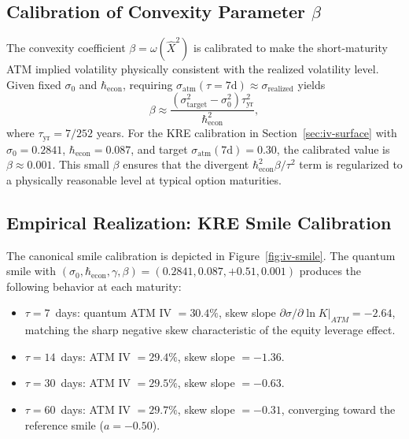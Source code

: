 \subsection{Calibration of Convexity Parameter \texorpdfstring{$\beta$}{beta}}

The convexity coefficient $\beta = \omega(\hat{X}^2)$ is calibrated to make the
short-maturity ATM implied volatility physically consistent with the realized
volatility level. Given fixed $\sigma_0$ and $\hbar_{\mathrm{econ}}$, requiring
$\sigma_{\mathrm{atm}}(\tau=7\text{d}) \approx \sigma_{\text{realized}}$ yields
\begin{equation*}
    \beta \approx \frac{\left(\sigma_{\mathrm{target}}^2 - \sigma_0^2\right) \tau_{\mathrm{yr}}^2}
        {\hbar_{\mathrm{econ}}^2},
\end{equation*}
where $\tau_{\mathrm{yr}} = 7/252$ years. For the KRE calibration in
Section~\ref{sec:iv-surface} with $\sigma_0 = 0.2841$,
$\hbar_{\mathrm{econ}} = 0.087$, and target $\sigma_{\mathrm{atm}}(7\text{d})
= 0.30$, the calibrated value is $\beta \approx 0.001$. This small $\beta$
ensures that the divergent $\hbar_{\mathrm{econ}}^2 \beta / \tau^2$ term is
regularized to a physically reasonable level at typical option maturities.

\subsection{Empirical Realization: KRE Smile Calibration}

The canonical smile calibration is depicted in Figure~\ref{fig:iv-smile}. The
quantum smile with $(\sigma_0, \hbar_{\mathrm{econ}}, \gamma, \beta) = (0.2841,
0.087, +0.51, 0.001)$ produces the following behavior at each maturity:

\begin{itemize}
    \item $\tau = 7$~days: quantum ATM IV $= 30.4\%$, skew slope
        $\partial\sigma/\partial\ln K \big|_{ATM} = -2.64$, matching the sharp
        negative skew characteristic of the equity leverage effect.
    \item $\tau = 14$~days: ATM IV $= 29.4\%$, skew slope $= -1.36$.
    \item $\tau = 30$~days: ATM IV $= 29.5\%$, skew slope $= -0.63$.
    \item $\tau = 60$~days: ATM IV $= 29.7\%$, skew slope $= -0.31$,
        converging toward the reference smile ($a = -0.50$).
\end{itemize}

